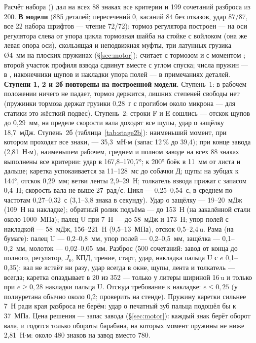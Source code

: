 Расчёт набора () дал на всех 88 знаках все критерии и 199 сочетаний разброса из 200. \textbf{В модели} (885 деталей; пересечений 0, касаний 84 без отказов, удар 87/87, все 22 набора шрифтов — чтение 72/72): тормоз регулятора построен — на оси регулятора слева от упора цикла тормозная шайба на стойке с войлоком (она же левая опора оси), скользящая и неподвижная муфты, три латунных грузика Ø4~мм на плоских пружинах (\S\ref{sec:motor});  считает с тормозом и с моментом ; второй участок профиля взвода сдвинут вместе с углом спуска; числа пружин — в , наконечники щупов и накладки упора полей — в примечаниях деталей. \textbf{Ступени 1, 2 и 2б повторены на построенной модели.} Ступень~1: в рабочем положении ничего не падает, тормоз держится, лишних степеней свободы нет (пружинки тормоза держат грузики 0,28~г с прогибом около микрона — для статики это жёсткий подвес). Ступень~2: строки F и E сошлись — отскок щупов до 0,29~мм, на пределе скорости вала доходят все щупы, удар о защёлку 18,7~мДж. Ступень~2б (таблица~\ref{tab:stage2b}): наименьший момент, при котором проходят все знаки, — 35,3~мН$\cdot$м (запас 12\,\% до 39,4); при конце завода (2,81~Н$\cdot$м), наименьшем рабочем, среднем и полном заводе на всех 88 знаках выполнены все критерии: удар в 167,8--170,7°; к 200° боёк в 11~мм от листа и дальше; каретка успокаивается за 11--128~мс до собачки Д; щупы на зубцах к 144°, отскок 0,29~мм; ветви ленты 2,9--29~Н; толкатель взвода прижат с запасом 0,4~Н; скорость вала не выше 27~рад/с. Цикл — 0,25--0,54~с, в среднем по частотам 0,27--0,32~с (3,1--3,8 знака в секунду). Удар о защёлку — 19--20~мДж (109~Н на накладке); обратный ролик подъёма — до 153~Н (на закалённой стали около 1000~МПа); палец U при 7~Н — до 58~мДж и 173~Н; упор полей с накладкой — 58~мДж, 156--221~Н (9,5--13~МПа), отскок 0,5--2,4\,u. Рама (на бумаге): палец U — 0,2--0,8~мм, упор полей — 0,2--0,5~мм, защёлка — 0,1--0,2~мм, молоток — 0,02--0,05~мм. Разброс (500 сочетаний: завод от конца до полного, регулятор, $J_0$, КПД, трение, старт, удар, накладка пальца U с $e$ 0,1--0,35): вал не встаёт ни разу, удар всегда в окне, щупы, лента и толкатель — всегда; каретка опаздывает в 20 из 352 — только у литеры шириной 16\,u и только при $e \ge 0{,}28$ накладки пальца U. Отсюда требование к накладке: $e \le 0{,}25$ (у полиуретана обычно около 0,2; проверить на стенде). Пружину каретки сильнее 7~Н ради края разброса не берём: удар о печатный зуб пальца подошёл бы к 37~МПа. Цена решения — запас завода (\S\ref{sec:motor}): каждый знак берёт оборот вала, и годятся только обороты барабана, на которых момент пружины не ниже 2,81~Н$\cdot$м: около 480 знаков на завод вместо 780.

